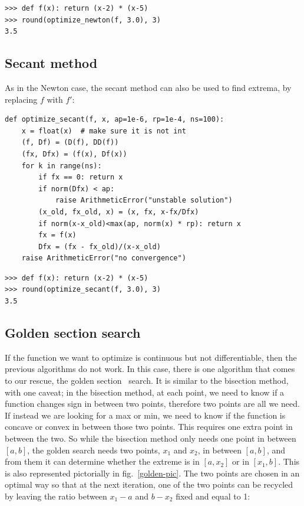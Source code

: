 \documentclass[justified, sixbynine]{tufte-book}
\def\ft{\small\tt}
\theoremstyle{plain}%
\newtheorem * {corollary}{Corollary}
\theoremstyle{definition}
\theoremstyle{remark}
\newtheorem * {remark}{Remark}
\newtheorem * {note}{Note}
\begin{document}
\begin{fullwidth}
\begin{lstlisting}[caption={in file: {\ft nlib.py}}]
>>> def f(x): return (x-2) * (x-5)
>>> round(optimize_newton(f, 3.0), 3)
3.5
\end{lstlisting}

\goodbreak\subsection{Secant method}


As in the Newton case, the secant method can also be used to find extrema, by replacing $f$ with $f'$:

\begin{lstlisting}[caption={in file: {\ft nlib.py}}]
def optimize_secant(f, x, ap=1e-6, rp=1e-4, ns=100):
    x = float(x)  # make sure it is not int
    (f, Df) = (D(f), DD(f))
    (fx, Dfx) = (f(x), Df(x))
    for k in range(ns):
        if fx == 0: return x
        if norm(Dfx) < ap:
            raise ArithmeticError("unstable solution")
        (x_old, fx_old, x) = (x, fx, x-fx/Dfx)
        if norm(x-x_old)<max(ap, norm(x) * rp): return x
        fx = f(x)
        Dfx = (fx - fx_old)/(x-x_old)
    raise ArithmeticError("no convergence")
\end{lstlisting}

\begin{lstlisting}[caption={in file: {\ft nlib.py}}]
>>> def f(x): return (x-2) * (x-5)
>>> round(optimize_secant(f, 3.0), 3)
3.5
\end{lstlisting}

\goodbreak\subsection{Golden section search}


If the function we want to optimize is continuous but not differentiable, then the previous algorithms do not work. In this case, there is one algorithm that comes to our rescue, the golden section~\cite{golden} search. It is similar to the bisection method, with one caveat; in the bisection method, at each point, we need to know if a function changes sign in between two points, therefore two points are all we need. If instead we are looking for a max or min, we need to know if the function is concave or convex in between those two points. This requires one extra point in between the two. So while the bisection method only needs one point in between $[a, b]$, the golden search needs two points, $x_1$ and $x_2$, in between $[a, b]$, and from them it can determine whether the extreme is in $[a, x_2]$ or in $[x_1, b]$. This is also represented pictorially in fig.~\ref{golden-pic}. The two points are chosen in an optimal way so that at the next iteration, one of the two points can be recycled by leaving the ratio between $x_1-a$ and $b-x_2$ fixed and equal to 1:


\end{fullwidth}
\end{document}
